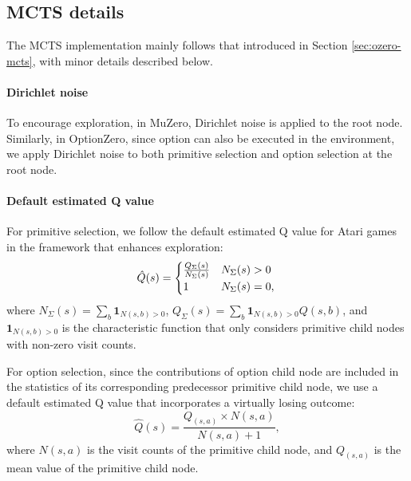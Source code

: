 \subsection{MCTS details}

The MCTS implementation mainly follows that introduced in Section \ref{sec:ozero-mcts}, with minor details described below.

\paragraph{Dirichlet noise}
To encourage exploration, in MuZero, Dirichlet noise is applied to the root node.
Similarly, in OptionZero, since option can also be executed in the environment, we apply Dirichlet noise to both primitive selection and option selection at the root node.

\paragraph{Default estimated Q value}
For primitive selection, we follow the default estimated Q value for Atari games in the framework \cite{wu_minizero_2024} that enhances exploration:
\begin{equation}
\hat{Q}(s) = 
\begin{cases}
\frac{Q_{\Sigma}(s)}{N_{\Sigma}(s)} & N_{\Sigma}(s)>0\\
1 & N_{\Sigma}(s)=0,
\end{cases} \\
\end{equation}
where $N_{\Sigma}(s) = \sum_{b} \mathbf{1}_{N(s,b)>0}$, $Q_{\Sigma}(s) = \sum_{b} \mathbf{1}_{N(s,b)>0}Q(s,b)$, and $\mathbf{1}_{N(s,b)>0}$ is the characteristic function that only considers primitive child nodes with non-zero visit counts.

For option selection, since the contributions of option child node are included in the statistics of its corresponding predecessor primitive child node, we use a default estimated Q value that incorporates a virtually losing outcome:
\begin{equation}
\hat{Q}(s) = \frac{Q_(s,a)\times N(s,a)}{N(s,a)+1},
\end{equation}
where $N(s,a)$ is the visit counts of the primitive child node, and $Q_(s,a)$ is the mean value of the primitive child node.

